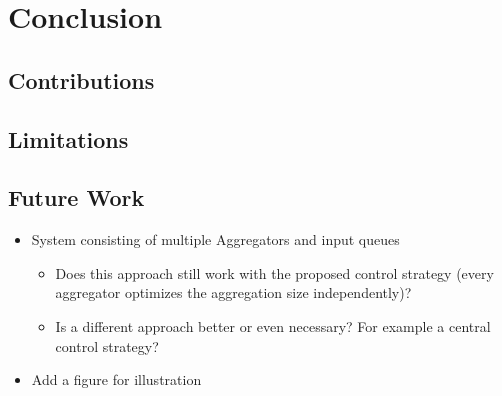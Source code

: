 \chapter{Conclusion}\label{ch:conclusion}

\section{Contributions}

\section{Limitations}

\section{Future Work}

\begin{itemize}
	\item System consisting of multiple Aggregators and input queues
	\begin{itemize}
		\item Does this approach still work with the proposed control strategy (every aggregator optimizes the aggregation size independently)?
		\item Is a different approach better or even necessary? For example a central control strategy?
	\end{itemize}
	\item Add a figure for illustration
\end{itemize}